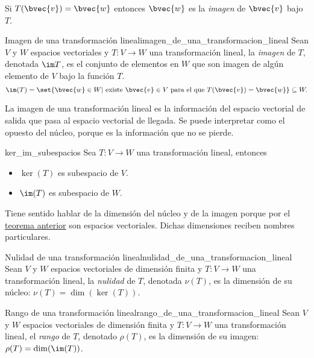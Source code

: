 \documentclass{fmbnotes}
\begin{document}
Si \(T(\bvec{v})=\bvec{w}\) entonces \( \bvec{w} \) es la \emph{imagen} de \(\bvec{v}\) bajo \(T\). 

\begin{definicion}{Imagen de una transformación lineal}{imagen_de_una_transformacion_lineal}
	Sean \(V\) y \(W\) espacios vectoriales y \(T:V\to W\) una transformación lineal, la \emph{imagen} de \(T\), denotada \(\im T\), es el conjunto de elementos en \(W\) que son imagen de algún elemento de \(V\) bajo la función \(T\). 
	\[\im(T)=\set{\bvec{w} \in W | \text{ existe } \bvec{v} \in V \text{ para el que } T(\bvec{v})=\bvec{w}} \subseteq W.\]
\end{definicion}
La imagen de una transformación lineal es la información del espacio vectorial de salida que pasa al espacio vectorial de llegada. Se puede interpretar como el opuesto del núcleo, porque es la información que no se pierde.

\begin{teorema}{}{ker_im_subespacios}
	Sea \(T\colon V\to W\) una transformación lineal, entonces
	\begin{itemize}
		\item \(\ker(T)\) es subespacio de \(V\).
		\item \(\im(T)\) es subespacio de \(W\).
	\end{itemize}
\end{teorema}

Tiene sentido hablar de la dimensión del núcleo y de la imagen porque por el \hyperlink{thm:ker_im_subespacios}{teorema anterior} son espacios vectoriales. Dichas dimensiones reciben nombres particulares.

\begin{definicion}{Nulidad de una transformación lineal}{nulidad_de_una_transformacion_lineal}
	Sean \(V\) y \(W\) espacios vectoriales de dimensión finita y \(T\colon V\to W\) una transformación lineal, la \emph{nulidad} de \(T\), denotada \(\nu(T)\), es la dimensión de su núcleo: 
	\(\nu(T)=\dim(\ker(T))\).
\end{definicion}

\begin{definicion}{Rango de una transformación lineal}{rango_de_una_transformacion_lineal}
	Sean \(V\) y \(W\) espacios vectoriales de dimensión finita y \(T\colon V\to W\) una transformación lineal, el \emph{rango} de \(T\), denotado \(\rho(T)\), es la dimensión de su imagen:
	\(\rho(T)=\dim(\im(T))\).
\end{definicion}
\end{document}
